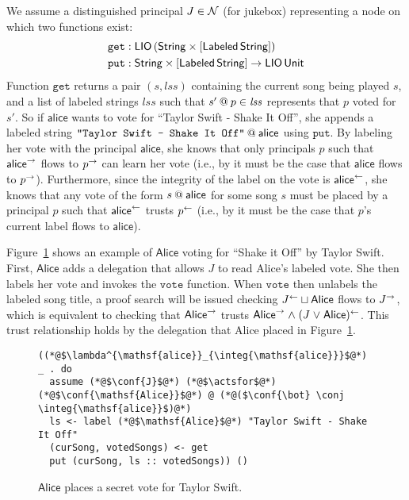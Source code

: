 We assume a distinguished principal $J \in \Nameset$ (for jukebox) representing a node on which two functions exist:
\begin{align*}
\mathtt{get}&: \liotype{(\pair{\String}{\listtype{\labeled{\String}}})}\\
\mathtt{put}&: \pair{\String}{\listtype{\labeled{\String}}} \to \liotype{\unit}
\end{align*}
Function $\mathtt{get}$ returns a pair $(\mathit{s}, \mathit{lss})$ containing the current song being played $s$, and a list of labeled strings $\mathit{lss}$ such that $\lb{p}{s'} \in \mathit{lss}$ represents that $p$ voted for $s'$. So if $\mathsf{alice}$ wants to vote for ``Taylor Swift - Shake It Off'', she appends a labeled string $\lb{\mathsf{alice}}{\texttt{"Taylor Swift - Shake It Off"}}$ using $\mathtt{put}$. By labeling her vote with the principal $\mathsf{alice}$, she knows that only principals $p$ such that $\conf{\mathsf{alice}}$ flows to $\conf{p}$ can learn her vote (i.e., by  it must be the case that $\mathsf{alice}$ flows to $\conf{p}$). Furthermore, since the integrity of the label on the vote is $\integ{\mathsf{alice}}$, she knows that any vote of the form $\lb{\mathsf{alice}}{s}$ for some song $s$ must be placed by a principal $p$ such that $\integ{\mathsf{alice}}$ trusts $\integ{p}$ (i.e., by  it must be the case that $p$'s current label flows to $\mathsf{alice}$).

Figure~\ref{fig:jukebox-alice-votes-for-taylor-swift} shows an example of $\mathsf{Alice}$ voting for ``Shake it Off'' by Taylor Swift. First, $\mathsf{Alice}$ adds a delegation that allows $J$ to read Alice's labeled vote. She then labels her vote and invokes the $\mathtt{vote}$ function. When $\mathtt{vote}$ then unlabels the labeled song title, a proof search will be issued checking $\integ{J} \join \mathsf{Alice}$ flows to $\conf{J}$, which is equivalent to checking that $\conf{\mathsf{Alice}}$ trusts $\conf{\mathsf{Alice}} \conj \integ{(J \disj \mathsf{Alice})}$. This trust relationship holds by the delegation that Alice placed in Figure~\ref{fig:jukebox-alice-votes-for-taylor-swift}.

\begin{figure}
\centering
\begin{lstlisting}
((*@$\lambda^{\mathsf{alice}}_{\integ{\mathsf{alice}}}$@*) _ . do
  assume (*@$\conf{J}$@*) (*@$\actsfor$@*) (*@$\conf{\mathsf{Alice}}$@*) @ (*@($\conf{\bot} \conj \integ{\mathsf{alice}}$)@*)
  ls <- label (*@$\mathsf{Alice}$@*) "Taylor Swift - Shake It Off"
  (curSong, votedSongs) <- get
  put (curSong, ls :: votedSongs)) ()
\end{lstlisting}
\caption{$\mathsf{Alice}$ places a secret vote for Taylor Swift.}
\label{fig:jukebox-alice-votes-for-taylor-swift}
\end{figure}


